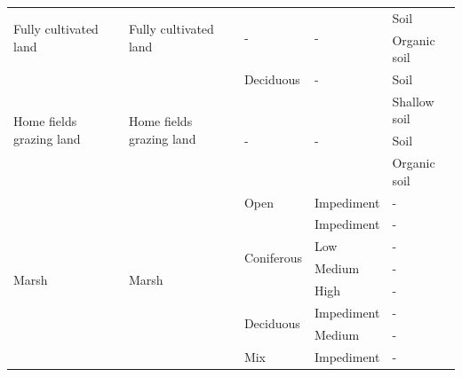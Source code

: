 \documentclass{article}
\begin{document}
\begin{longtable}{ p{4cm} | p{4cm} l l l}
\hline
\multirow{2}{*}{Fully cultivated land} & \multirow{2}{*}{Fully cultivated land} & \multirow{2}{*}{-}  & \multirow{2}{*}{-}  &   Soil \\     \cline{5-5}
                        &                           &                           &                                   &       Organic soil \\ \cline{5-5}
\hline
\multirow{4}{*}{Home fields grazing land} & \multirow{4}{*}{Home fields grazing land}  & Deciduous &    -           &       Soil \\         \cline{3-5}
                        &                           &   \multirow{3}{*}{-}      &    \multirow{3}{*}{-}             &       Shallow soil \\ \cline{5-5}
                        &                           &                           &                                   &       Soil \\         \cline{5-5}
                        &                           &                           &                                   &       Organic soil \\ \cline{5-5}
\hline
\multirow{9}{*}{Marsh}  & \multirow{9}{*}{Marsh}    &   Open                    &       Impediment                  &       - \\            \cline{3-5}
                        &                           & \multirow{4}{*}{Coniferous}   &   Impediment                  &       - \\            \cline{5-5}
                        &                           &                           &       Low                         &       - \\            \cline{5-5}
                        &                           &                           &       Medium                      &       - \\            \cline{5-5}
                        &                           &                           &       High                        &       - \\            \cline{3-5}
                        &                           & \multirow{2}{*}{Deciduous}    &   Impediment                  &       - \\            \cline{5-5}
                        &                           &                           &       Medium                      &       - \\            \cline{3-5}
                        &                           & \multirow{2}{*}{Mix}      &       Impediment                  &       - \\            \cline{5-5}

\end{longtable}
\end{document}
